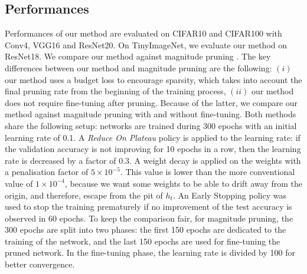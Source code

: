 \subsection{Performances}
\label{sec:chap1:performances}
Performances of our method are evaluated on CIFAR10 and CIFAR100 with Conv4,
VGG16 and ResNet20. On TinyImageNet, we evaluate our method on ResNet18. We
compare our method against magnitude pruning \cite{DBLP:conf/nips/HanPTD15}. The
key differences between our method and magnitude pruning are the following:
$(i)$ our method uses a budget loss to encourage sparsity, which takes into
account the final pruning rate from the beginning of the training process,
$(ii)$ our method does not require fine-tuning after pruning. Because of the
latter, we compare our method against magnitude pruning with and without
fine-tuning. Both methods share the following setup: networks are trained during
300 epochs with an initial learning rate of 0.1. A {\em Reduce On Plateau}
policy is applied to the learning rate: if the validation accuracy is not
improving for 10 epochs in a row, then the learning rate is decreased by a
factor of 0.3. A weight decay is applied on the weights with a penalisation
factor of $5\times10^{−5}$. This value is lower than the more conventional value
of $1\times10^{-4}$, because we want some weights to be able to drift away from the
origin, and therefore, escape from the pit of $h_t$. An Early Stopping policy was
used to stop the training prematurely if no improvement of the test accuracy is
observed in 60 epochs. To keep the comparison fair, for magnitude pruning, the
300 epochs are split into two phases: the first 150 epochs are dedicated to the
training of the network, and the last 150 epochs are used for fine-tuning the
pruned network. In the fine-tuning phase, the learning rate is divided by 100
for better convergence. \\

